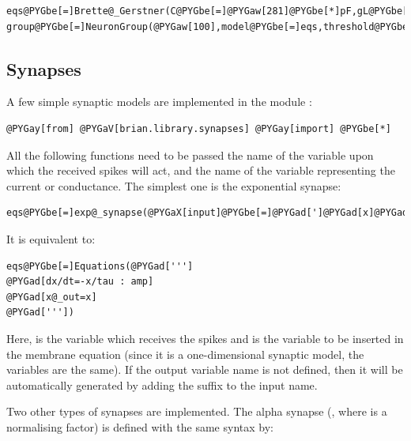 \documentclass[letterpaper,10pt,english]{manual}
\begin{document}
\begin{Verbatim}[commandchars=@\[\]]
eqs@PYGbe[=]Brette@_Gerstner(C@PYGbe[=]@PYGaw[281]@PYGbe[*]pF,gL@PYGbe[=]@PYGaw[30]@PYGbe[*]nS,EL@PYGbe[=]@PYGbe[-]@PYGaw[70.6]@PYGbe[*]mV,VT@PYGbe[=]@PYGbe[-]@PYGaw[50.4]@PYGbe[*]mV,DeltaT@PYGbe[=]@PYGaw[2]@PYGbe[*]mV,tauw@PYGbe[=]@PYGaw[144]@PYGbe[*]ms,a@PYGbe[=]@PYGaw[4]@PYGbe[*]nS)
group@PYGbe[=]NeuronGroup(@PYGaw[100],model@PYGbe[=]eqs,threshold@PYGbe[=]@PYGbe[-]@PYGaw[43]@PYGbe[*]mV,reset@PYGbe[=]AdaptiveReset(Vr@PYGbe[=]@PYGbe[-]@PYGaw[70.6]@PYGbe[*]mvolt,b@PYGbe[=]@PYGaw[0.0805]@PYGbe[*]nA))
\end{Verbatim}


\subsection{Synapses}

A few simple synaptic models are implemented in the module :

\begin{Verbatim}[commandchars=@\[\]]
@PYGay[from] @PYGaV[brian.library.synapses] @PYGay[import] @PYGbe[*]
\end{Verbatim}

All the following functions need to be passed the name of the variable upon which the received spikes
will act, and the name of the variable representing the current or conductance.
The simplest one is the exponential synapse:

\begin{Verbatim}[commandchars=@\[\]]
eqs@PYGbe[=]exp@_synapse(@PYGaX[input]@PYGbe[=]@PYGad[']@PYGad[x]@PYGad['],tau@PYGbe[=]@PYGaw[10]@PYGbe[*]ms,unit@PYGbe[=]amp,output@PYGbe[=]@PYGad[']@PYGad[x@_current]@PYGad['])
\end{Verbatim}

It is equivalent to:

\begin{Verbatim}[commandchars=@\[\]]
eqs@PYGbe[=]Equations(@PYGad[''']
@PYGad[dx/dt=-x/tau : amp]
@PYGad[x@_out=x]
@PYGad['''])
\end{Verbatim}

Here,  is the variable which receives the spikes and  is the variable to be inserted in
the membrane equation (since it is a one-dimensional synaptic model, the variables are the same).
If the output variable name is not defined, then it will be automatically generated by adding the
suffix  to the input name.

Two other types of synapses are implemented. The alpha synapse (, where
 is a normalising factor) is defined with the same syntax by:
\end{document}
